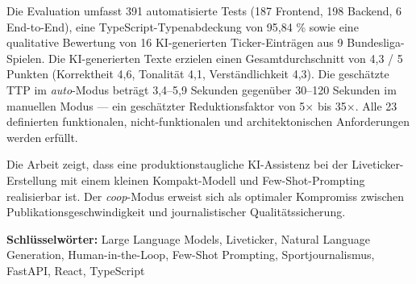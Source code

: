 \documentclass[12pt,a4paper,notitlepage,ngerman]{report}
\begin{document}
Die Evaluation umfasst 391 automatisierte Tests (187 Frontend, 198 Backend, 6 End-to-End), eine TypeScript-Typenabdeckung von 95,84 \% sowie eine qualitative Bewertung von 16 KI-generierten Ticker-Einträgen aus 9 Bundesliga-Spielen. Die KI-generierten Texte erzielen einen Gesamtdurchschnitt von 4,3 / 5 Punkten (Korrektheit 4,6, Tonalität 4,1, Verständlichkeit 4,3). Die geschätzte TTP im \textit{auto}-Modus beträgt 3,4–5,9 Sekunden gegenüber 30–120 Sekunden im manuellen Modus — ein geschätzter Reduktionsfaktor von 5× bis 35×. Alle 23 definierten funktionalen, nicht-funktionalen und architektonischen Anforderungen werden erfüllt.

Die Arbeit zeigt, dass eine produktionstaugliche KI-Assistenz bei der Liveticker-Erstellung mit einem kleinen Kompakt-Modell und Few-Shot-Prompting realisierbar ist. Der \textit{coop}-Modus erweist sich als optimaler Kompromiss zwischen Publikationsgeschwindigkeit und journalistischer Qualitätssicherung.

\noindent\textbf{Schlüsselwörter:} Large Language Models, Liveticker, Natural Language Generation, Human-in-the-Loop, Few-Shot Prompting, Sportjournalismus, FastAPI, React, TypeScript

\tableofcontents

















\appendix

\end{document}

